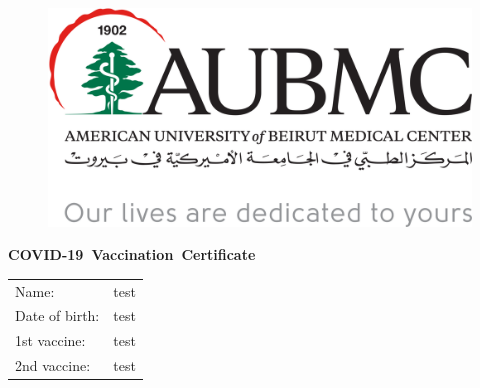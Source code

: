 \documentclass{article}
\begin{document}
\pagestyle{empty}
\begin{figure}[h!]
  \centering
  \includegraphics[width=1\textwidth,height=0.4\textheight]{./AUBCMC.png}
  \label{fig:example}
\end{figure}
\begin{center}
  {\huge\bfseries\mbox{COVID-19 Vaccination Certificate}} \\[40pt]
\begin{tabular}{ll}
    \fontsize{15}{14}\selectfont Name: &\fontsize{15}{14}\selectfont test\\[15pt]
	\fontsize{15}{14}\selectfont Date of birth: &\fontsize{15}{14}\selectfont test\\[15pt]
	\fontsize{15}{14}\selectfont 1st vaccine: &\fontsize{15}{14}\selectfont test\\[15pt]
	\fontsize{15}{14}\selectfont 2nd vaccine: &\fontsize{15}{14}\selectfont test\\[15pt]

\end{tabular}




	
\end{center}
\end{document}
